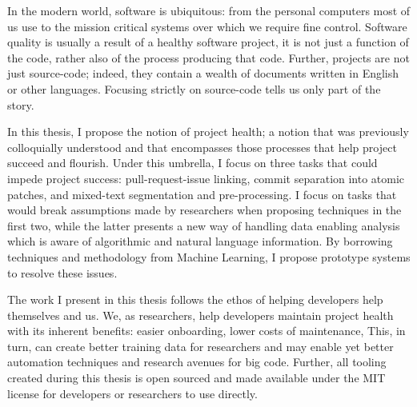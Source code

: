 In the modern world, software is ubiquitous: from the personal computers most of
us use to the mission critical systems over which we require fine control.
Software quality is usually a result of a healthy software project, \ie it is
not just a function of the code, rather also of the process producing that code.
Further, projects are not just source-code; indeed, they contain a wealth of
documents written in English or other languages. Focusing strictly on
source-code tells us only part of the story.

In this thesis, I propose the notion of project health; a notion that was
previously colloquially understood and that encompasses those processes that
help project succeed and flourish. Under this umbrella, I focus on three tasks
that could impede project success: pull-request-issue linking, commit separation
into atomic patches, and mixed-text segmentation and pre-processing. I focus on
tasks that would break assumptions made by researchers when proposing techniques
in the first two, while the latter presents a new way of handling data enabling
analysis which is aware of algorithmic and natural language information. By
borrowing techniques and methodology from Machine Learning, I propose prototype
systems to resolve these issues.

The work I present in this thesis follows the ethos of helping developers help
themselves and us. We, as researchers, help developers maintain project health
with its inherent benefits: easier onboarding, lower costs of maintenance, \etc
This, in turn, can create better training data for researchers and may enable
yet better automation techniques and research avenues for big code. Further, all
tooling created during this thesis is open sourced and made available under the
MIT license for developers or researchers to use directly.